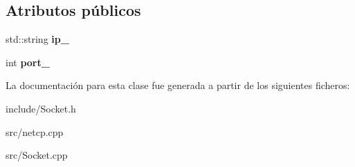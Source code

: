 \subsection*{Atributos públicos}
\begin{DoxyCompactItemize}
\item 
\mbox{\label{classSocket_af80901a563f5fd40f32d7c632818a259}} 
std\+::string {\bfseries ip\+\_\+}
\item 
\mbox{\label{classSocket_a51208d8cfb3628bb68f3faceb86473dc}} 
int {\bfseries port\+\_\+}
\end{DoxyCompactItemize}


La documentación para esta clase fue generada a partir de los siguientes ficheros\+:\begin{DoxyCompactItemize}
\item 
include/Socket.\+h\item 
src/netcp.\+cpp\item 
src/Socket.\+cpp\end{DoxyCompactItemize}
